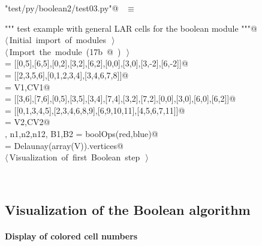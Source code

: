\documentclass[11pt,oneside]{article}	%
\begin{document}
\begin{flushleft} \small
\begin{minipage}{\linewidth} \label{scrap37}
\verb@"test/py/boolean2/test03.py"@\nobreak\ {\footnotesize {} }$\equiv$
\vspace{-1ex}
\begin{list}{}{} \item
\mbox{}\verb@""" test example with general LAR cells for the boolean module """@\\
\mbox{}\verb@@\hbox{$\langle\,$Initial import of modules\nobreak\ {\footnotesize {}}$\,\rangle$}\verb@@\\
\mbox{}\verb@@\hbox{$\langle\,$Import the module\nobreak\ ({\footnotesize 17b\label{scrap38}
 }\mbox{}@ ) {\footnotesize {}}$\,\rangle$}\verb@@\\
\mbox{} = [[0,5],[6,5],[0,2],[3,2],[6,2],[0,0],[3,0],[3,-2],[6,-2]]@\\
\mbox{} = [[2,3,5,6],[0,1,2,3,4],[3,4,6,7,8]]@\\
\mbox{}\verb@blue = V1,CV1@\\
\mbox{} = [[3,6],[7,6],[0,5],[3,5],[3,4],[7,4],[3,2],[7,2],[0,0],[3,0],[6,0],[6,2]]@\\
\mbox{} = [[0,1,3,4,5],[2,3,4,6,8,9],[6,9,10,11],[4,5,6,7,11]]@\\
\mbox{}\verb@red = V2,CV2@\\
\mbox{}\verb@V, n1,n2,n12, B1,B2 = boolOps(red,blue)@\\
\mbox{}\verb@CV = Delaunay(array(V)).vertices@\\
\mbox{}\verb@@\hbox{$\langle\,$Visualization of first Boolean step\nobreak\ {\footnotesize {}}$\,\rangle$}\verb@@\\
\mbox{}\verb@@{\NWsep}
\end{list}
\vspace{-2ex}
\end{minipage}\\[4ex]
\end{flushleft}

\subsection{Visualization of the Boolean algorithm}

\paragraph{Display of colored cell numbers}
\end{document}
